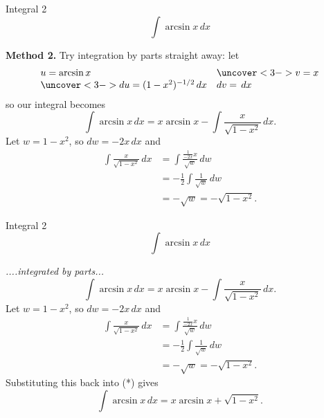 \documentclass{beamer}
\begin{document}
\begin{frame}
  \begin{block}{Integral 2}
    \begin{displaymath}
      \int \arcsin x \, dx
    \end{displaymath}
  \end{block}
  \pause
  \textbf{Method 2.} Try integration by parts straight away: let
  \begin{displaymath}
    \begin{array}{ll}
      u = \arcsin x & \uncover<3->{v = x}\\
      \uncover<3->{du = (1-x^2)^{-1/2} \, dx} & dv = \, dx
    \end{array}
  \end{displaymath}
  \pause\pause
  so our integral becomes
  \begin{equation}\tag{*}
    \int \arcsin x \, dx = x\arcsin x - \int \frac{x}{\sqrt{1-x^2}} \,dx.
  \end{equation}
  \pause
  Let $ w = 1-x^2 $, so $ dw = -2x \, dx $ and
  \begin{align*}
    \int \frac{x}{\sqrt{1-x^2}} \,dx &= \int \frac{\frac{1}{-2x} x }{\sqrt{w}} \, dw\\
                                     &= -\frac{1}{2}\int \frac{1}{\sqrt{w}} \, dw\\
                                     &= -\sqrt{w} = -\sqrt{1-x^2}.
  \end{align*}
\end{frame}

\begin{frame}
  \begin{block}{Integral 2}
    \begin{displaymath}
      \int \arcsin x \, dx
    \end{displaymath}
  \end{block}
  \textit{\color{gray}....integrated by parts...}
  \begin{equation}\tag{*}
    \int \arcsin x \, dx = x\arcsin x - \int \frac{x}{\sqrt{1-x^2}} \,dx.
  \end{equation}
  Let $ w = 1-x^2 $, so $ dw = -2x \, dx $ and
  \begin{align*}
    \int \frac{x}{\sqrt{1-x^2}} \,dx &= \int \frac{\frac{1}{-2x} x }{\sqrt{w}} \, dw\\
                                     &= -\frac{1}{2}\int \frac{1}{\sqrt{w}} \, dw\\
                                     &= -\sqrt{w} = -\sqrt{1-x^2}.
  \end{align*}
  \pause
  Substituting this back into (*) gives
  \begin{displaymath}
    \int \arcsin x \, dx = x\arcsin x + \sqrt{1-x^2}.
  \end{displaymath}
\end{frame}
\end{document}
